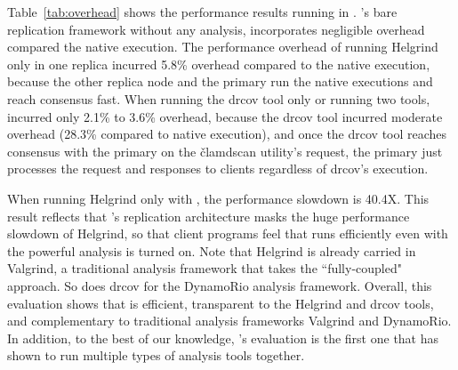 Table~\ref{tab:overhead} shows the performance results running \clamav in 
\xxx. \xxx's bare replication framework without any analysis, incorporates 
negligible overhead compared the native execution. The performance overhead of 
running Helgrind only in one replica incurred 5.8\% overhead compared to the 
native execution, because the other replica node and the primary run the native 
executions and reach consensus fast. When running the drcov tool only or 
running two tools, \xxx incurred only 2.1\% to 3.6\% overhead, because the 
drcov tool incurred moderate overhead (28.3\% compared to native execution), 
and once the drcov tool reaches consensus with the primary on the \v{clamdscan} 
utility's request, the primary just processes the request and responses to 
clients regardless of drcov's execution.

When running Helgrind only with \clamav, the performance slowdown is 40.4X. 
This result reflects that \xxx's 
replication architecture masks the huge performance slowdown of Helgrind, so 
that client programs feel that \clamav runs efficiently even with the 
powerful analysis is turned on. Note that Helgrind is already carried in Valgrind, 
a traditional analysis framework that takes the ``fully-coupled" approach. So 
does drcov for the DynamoRio analysis framework. Overall, this evaluation shows 
that \xxx is efficient, transparent to the 
Helgrind and drcov tools, and complementary to traditional analysis frameworks 
Valgrind and DynamoRio. In addition, to the best of our knowledge, \xxx's evaluation is the first one that has shown to run multiple types of analysis tools together.
